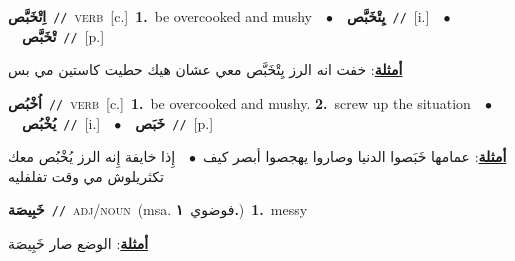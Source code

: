 \documentclass[10pt,a4paper,twoside]{article} %
\begin{document}
\begin{multicols}{2}
{{\setlength\topsep{0pt}\textbf{\foreignlanguage{arabic}{اِتْخَبَّص}}\ {\color{gray}\texttt{//}\color{black}}\ \textsc{verb}\ [c.]\ \textbf{1.}~be overcooked and mushy\ \ $\bullet$\ \ \setlength\topsep{0pt}\textbf{\foreignlanguage{arabic}{يِتْخَبَّص}}\ {\color{gray}\texttt{//}\color{black}}\ [i.]\ \ $\bullet$\ \ \setlength\topsep{0pt}\textbf{\foreignlanguage{arabic}{تْخَبَّص}}\ {\color{gray}\texttt{//}\color{black}}\ [p.]\  \begin{flushright}\color{gray}\foreignlanguage{arabic}{\textbf{\underline{\foreignlanguage{arabic}{أمثلة}}}: خفت انه الرز يِتْخَبَّص معي عشان هيك حطيت كاستين مي بس}\end{flushright}\color{black}} \vspace{2mm}

{\setlength\topsep{0pt}\textbf{\foreignlanguage{arabic}{اُخْبُص}}\ {\color{gray}\texttt{//}\color{black}}\ \textsc{verb}\ [c.]\ \textbf{1.}~be overcooked and mushy.  \textbf{2.}~screw up the situation\ \ $\bullet$\ \ \setlength\topsep{0pt}\textbf{\foreignlanguage{arabic}{يُخْبُص}}\ {\color{gray}\texttt{//}\color{black}}\ [i.]\ \ $\bullet$\ \ \setlength\topsep{0pt}\textbf{\foreignlanguage{arabic}{خَبَص}}\ {\color{gray}\texttt{//}\color{black}}\ [p.]\  \begin{flushright}\color{gray}\foreignlanguage{arabic}{\textbf{\underline{\foreignlanguage{arabic}{أمثلة}}}: عمامها خَبَصوا الدنيا وصاروا يهجصوا أبصر كيف\ $\bullet$\ \  إِذا خايفة إِنه الرز يُخْبُص معك تكثريلوش مي وقت تفلفليه}\end{flushright}\color{black}} \vspace{2mm}

{\setlength\topsep{0pt}\textbf{\foreignlanguage{arabic}{خَبِيصَة}}\ {\color{gray}\texttt{//}\color{black}}\ \textsc{adj/noun}\ \color{gray}(msa. \foreignlanguage{arabic}{فوضوي}~\foreignlanguage{arabic}{\textbf{١.}})\color{black}\ \textbf{1.}~messy\  \begin{flushright}\color{gray}\foreignlanguage{arabic}{\textbf{\underline{\foreignlanguage{arabic}{أمثلة}}}: الوضع صار خَبِيصَة}\end{flushright}\color{black}} \vspace{2mm}

}
\end{multicols}
\end{document}

